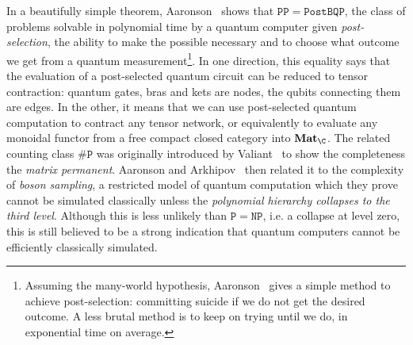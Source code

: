 In a beautifully simple theorem, Aaronson~\cite{Aaronson05} shows that $\mathtt{PP} = \mathtt{PostBQP}$, the class of problems solvable in polynomial time by a quantum computer given \emph{post-selection}, the ability to make the possible necessary and to choose what outcome we get from a quantum measurement\footnote
{Assuming the many-world hypothesis, Aaronson~\cite{Aaronson05} gives a simple method to achieve post-selection: committing suicide if we do not get the desired outcome.
A less brutal method is to keep on trying until we do, in exponential time on average.}.
In one direction, this equality says that the evaluation of a post-selected quantum circuit can be reduced to tensor contraction: quantum gates, bras and kets are nodes, the qubits connecting them are edges.
In the other, it means that we can use post-selected quantum computation to contract any tensor network, or equivalently to evaluate any monoidal functor from a free compact closed category into $\mathbf{Mat}_\C$.
The related counting class $\mathtt{\#P}$ was originally introduced by Valiant~\cite{Valiant79} to show the completeness the \emph{matrix permanent}.
Aaronson and Arkhipov~\cite{AaronsonArkhipov11} then related it to the complexity of \emph{boson sampling}, a restricted model of quantum computation which they prove cannot be simulated classically unless the \emph{polynomial hierarchy collapses to the third level}.
Although this is less unlikely than $\mathtt{P} = \mathtt{NP}$, i.e. a collapse at level zero, this is still believed to be a strong indication that quantum computers cannot be efficiently classically simulated.

